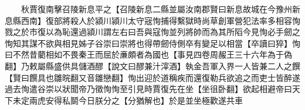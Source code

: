 　　秋賈復南擊召陵新息平之【召陵新息二縣並屬汝南郡賢曰新息故城在今豫州新息縣西南】復部將殺人於潁川潁川太守宼恂捕得繫獄時尚草創軍營犯法率多相容恂戮之於市復以為恥還過潁川謂左右曰吾與寇恂並列將帥而為其所䧟今見恂必手劒之恂知其謀不欲與相見姊子谷崇曰崇將也得帶劒侍側卒有變足以相當【卒讀曰猝】恂曰不然昔藺相如不畏秦王而屈於亷頗者為國也【事見四卷周赧王三十六年為于偽翻】乃敕屬縣盛供具儲酒醪【說文曰醪兼汁滓酒】執金吾軍入界一人皆兼二人之饌【賢曰饌具也雛晥翻又音雛戀翻】恂出迎於道稱疾而還復勒兵欲追之而吏士皆醉遂過去恂遣谷崇以狀聞帝乃徵恂恂至引見時賈復先在坐【坐徂卧翻】欲起相避帝曰天下未定兩虎安得私鬬今日朕分之【分猶解也】於是並坐極歡遂共車